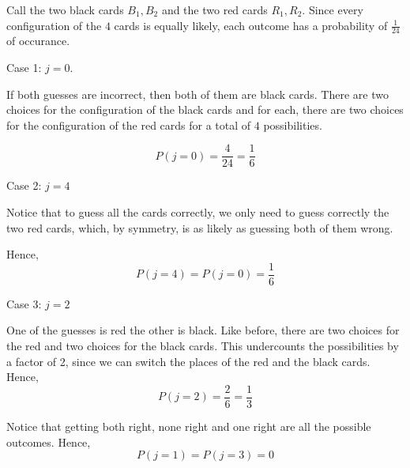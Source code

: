Call the two black cards $B_{1}, B_{2}$ and the two red cards $R_{1}, R_{2}$.
Since every configuration of the $4$ cards is equally likely, each outcome has 
a probability of $\frac{1}{24}$ of occurance.

Case 1: $j = 0$.

If both guesses are incorrect, then both of them are black cards. There are 
two choices for the configuration of the black cards and for each, there are 
two choices for the configuration of the red cards for a total of $4$ possibilities.

$$P(j=0) = \frac{4}{24} = \frac{1}{6}$$

Case 2: $j = 4$

Notice that to guess all the cards correctly, we only need to guess correctly 
the two red cards, which, by symmetry, is as likely as guessing both of them wrong.

Hence, $$P(j=4) = P(j=0) = \frac{1}{6}$$

Case 3: $j=2$

One of the guesses is red the other is black. Like before, there are two 
choices for the red and two choices for the black cards. This undercounts the 
possibilities by a factor of 2, since we can switch the places of the red and 
the black cards. Hence, $$P(j=2) = \frac{2}{6} = \frac{1}{3}$$

Notice that getting both right, none right and one right are all the possible 
outcomes. Hence, $$P(j=1) = P(j=3) = 0$$